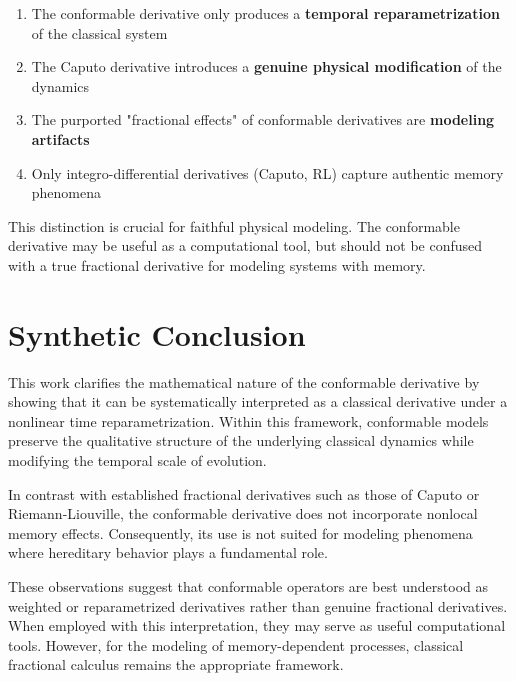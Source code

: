 \documentclass[preprint,12pt]{elsarticle}
\begin{document}
\begin{enumerate}
\item The conformable derivative only produces a \textbf{temporal reparametrization} of the classical system

\item The Caputo derivative introduces a \textbf{genuine physical modification} of the dynamics

\item The purported "fractional effects" of conformable derivatives are \textbf{modeling artifacts}

\item Only integro-differential derivatives (Caputo, RL) capture authentic memory phenomena
\end{enumerate}

This distinction is crucial for faithful physical modeling. The conformable derivative may be useful as a computational tool, but should not be confused with a true fractional derivative for modeling systems with memory.

\section*{Synthetic Conclusion}

This work clarifies the mathematical nature of the conformable derivative by showing that it can be systematically interpreted as a classical derivative under a nonlinear time reparametrization. Within this framework, conformable models preserve the qualitative structure of the underlying classical dynamics while modifying the temporal scale of evolution.

In contrast with established fractional derivatives such as those of Caputo or Riemann-Liouville, the conformable derivative does not incorporate nonlocal memory effects. Consequently, its use is not suited for modeling phenomena where hereditary behavior plays a fundamental role.

These observations suggest that conformable operators are best understood as weighted or reparametrized derivatives rather than genuine fractional derivatives. When employed with this interpretation, they may serve as useful computational tools. However, for the modeling of memory-dependent processes, classical fractional calculus remains the appropriate framework.
\end{document}
